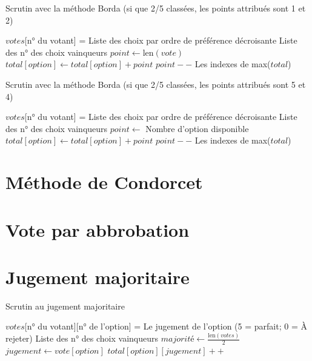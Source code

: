 \documentclass[../report]{subfiles}
\begin{document}
  \begin{algorithm}
  \caption{Scrutin avec la méthode Borda (si que 2/5 classées, les points attribués sont 1 et 2)}
  \label{scrutin:borda-max-nbclassee}
  \begin{algorithmic}[1]
  \REQUIRE $votes$[n° du votant] = Liste des choix par ordre de préférence décroisante
  \ENSURE Liste des n° des choix vainqueurs
    \STATE $point \leftarrow \text{len}(vote)$
      \STATE $total[option] \leftarrow total[option] + point$
      \STATE $point--$
    \ENDFOR
  \ENDFOR
  \RETURN Les indexes de max($total$)
  \end{algorithmic}
  \end{algorithm}
  
  \begin{algorithm}
  \caption{Scrutin avec la méthode Borda (si que 2/5 classées, les points attribués sont 5 et 4)}
  \label{scrutin:borda-max-nboption}
  \begin{algorithmic}[1]
  \REQUIRE $votes$[n° du votant] = Liste des choix par ordre de préférence décroisante
  \ENSURE Liste des n° des choix vainqueurs
    \STATE $point \leftarrow $ Nombre d'option disponible
      \STATE $total[option] \leftarrow total[option] + point$
      \STATE $point--$
    \ENDFOR
  \ENDFOR
  \RETURN Les indexes de max($total$)
  \end{algorithmic}
  \end{algorithm}
  
  
  \section{Méthode de Condorcet}
  \todo{}
  \section{Vote par abbrobation}
  \todo{}
  
  \section{Jugement majoritaire}
  \todo{}
  
  \begin{algorithm}
  \caption{Scrutin au jugement majoritaire}
  \label{scrutin:jugement-maj}
  \begin{algorithmic}[1]
  \REQUIRE $votes$[n° du votant][n° de l'option] = Le jugement de l'option (5 = parfait; 0 = À rejeter)
  \ENSURE Liste des n° des choix vainqueurs
  \STATE $majorité \leftarrow \frac{\text{len}(votes)}{2}$
      \STATE $jugement \leftarrow vote[option]$
      \STATE $total[option][jugement] ++$
    \ENDFOR
  \ENDFOR
  \end{algorithmic}
  \end{algorithm}
  
\end{document}
